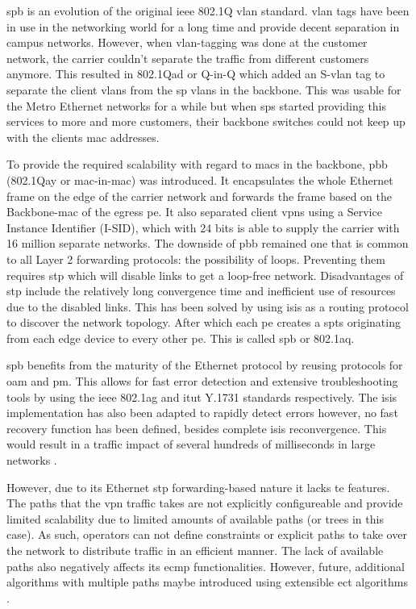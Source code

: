 \ac{spb} is an evolution of the original \acs{ieee} 802.1Q \ac{vlan} standard. \ac{vlan} tags have been in use in the networking world for a long time and provide decent separation in campus networks. However, when \ac{vlan}-tagging was done at the customer network, the carrier couldn't separate the traffic from different customers anymore. This resulted in 802.1Qad or Q-in-Q which added an S-\ac{vlan} tag to separate the client \acp{vlan} from the \ac{sp} \acp{vlan} in the backbone. This was usable for the Metro Ethernet networks for a while but when \acp{sp} started providing this services to more and more customers, their backbone switches could not keep up with the clients \ac{mac} addresses.

To provide the required scalability with regard to \acp{mac} in the backbone, \ac{pbb} (802.1Qay or \ac{mac}-in-\ac{mac}) was introduced. It encapsulates the whole Ethernet frame on the edge of the carrier network and forwards the frame based on the Backbone-\ac{mac} of the egress \ac{pe}. It also separated client \acp{vpn} using a Service Instance Identifier (I-SID), which with 24 bits is able to supply the carrier with 16 million separate networks. The downside of \ac{pbb} remained one that is common to all Layer 2 forwarding protocols: the possibility of loops. Preventing them requires \ac{stp} which will disable links to get a loop-free network. Disadvantages of \ac{stp} include the relatively long convergence time and inefficient use of resources due to the disabled links. This has been solved by using \acs{isis} as a routing protocol to discover the network topology. After which each \ac{pe} creates a \acp{spt} originating from each edge device to every other \ac{pe}. This is called \ac{spb} or 802.1aq.

\ac{spb} benefits from the maturity of the Ethernet protocol by reusing protocols for \ac{oam} and \ac{pm}. This allows for fast error detection and extensive troubleshooting tools by using the \ac{ieee} 802.1ag and \ac{itut} Y.1731 standards respectively. The \ac{isis} implementation has also been adapted to rapidly detect errors however, no fast recovery function has been defined, besides complete \ac{isis} reconvergence. This would result in a traffic impact of several hundreds of milliseconds in large networks \cite{spb-nanog}. 

However, due to its Ethernet \acs{stp} forwarding-based nature it lacks \ac{te} features. The paths that the \ac{vpn} traffic takes are not explicitly configureable and provide limited scalability due to limited amounts of available paths (or trees in this case). As such, operators can not define constraints or explicit paths to take over the network to distribute traffic in an efficient manner. The lack of available paths also negatively affects its \ac{ecmp} functionalities. However, future, additional algorithms with multiple paths maybe introduced using extensible \ac{ect} algorithms \cite{rfc6329}.


